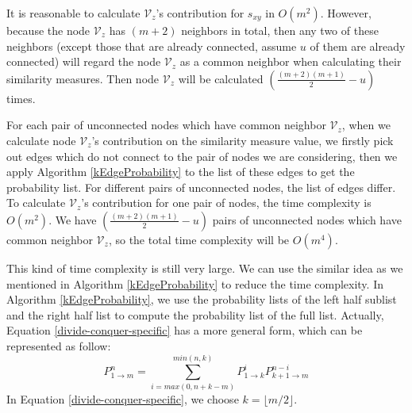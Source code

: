 \documentclass[\main/thesis.tex]{subfiles}
\begin{document}
It is reasonable to calculate $\mathcal{V}_z$'s contribution for $s_{xy}$ in $O(m^2)$. However, because the node $\mathcal{V}_z$ has $(m+2)$ neighbors in total, then any two of these neighbors (except those that are already connected, assume $u$ of them are already connected) will regard the node $\mathcal{V}_z$ as a common neighbor when calculating their similarity measures. Then node $\mathcal{V}_z$ will be calculated $(\frac{(m+2)(m+1)}{2}-u)$ times. 


For each pair of unconnected nodes which have common neighbor $\mathcal{V}_z$, when we calculate node $\mathcal{V}_z$'s contribution on the similarity measure value, we firstly pick out edges which do not connect to the pair of nodes we are considering, then we apply Algorithm \ref{kEdgeProbability} to the list of these edges to get the probability list. For different pairs of unconnected nodes, the list of edges differ. To calculate $\mathcal{V}_z$'s contribution for one pair of nodes, the time complexity is $O(m^2)$. We have $(\frac{(m+2)(m+1)}{2}-u)$ pairs of unconnected nodes which have common neighbor $\mathcal{V}_z$, so the total time complexity will be $O(m^4)$.

This kind of time complexity is still very large. We can use the similar idea as we mentioned in Algorithm \ref{kEdgeProbability} to reduce the time complexity. In Algorithm \ref{kEdgeProbability}, we use the probability lists of the left half sublist and the right half list to compute the probability list of the full list. Actually, Equation \ref{divide-conquer-specific} has a more general form, which can be represented as follow:
\begin{equation}
P_{1\rightarrow m}^n=\sum_{i=max(0,n+k-m)}^{min(n,k)}P_{1\rightarrow k}^i P_{k+1\rightarrow m}^{n-i}
\label{divide-conquer-general}
\end{equation}
In Equation \ref{divide-conquer-specific}, we choose $k=\lfloor m/2 \rfloor$.
\end{document}
